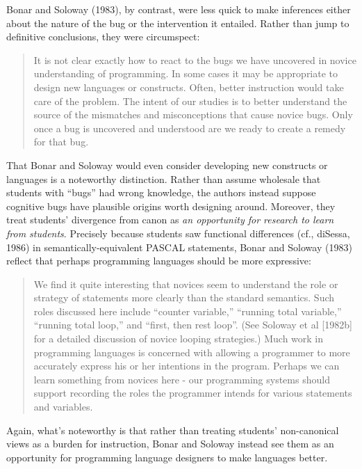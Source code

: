 Bonar and Soloway (1983), by contrast, were less quick to make
inferences either about the nature of the bug or the intervention
it entailed. Rather than jump to definitive conclusions, they were
circumspect:

\begin{quote}
  It is not clear exactly how to react to the bugs we have uncovered in
  novice understanding of programming. In some cases it may be appropriate
  to design new languages or constructs. Often, better instruction would
  take care of the problem. The intent of our studies is to better
  understand the source of the mismatches and misconceptions that cause
  novice bugs. Only once a bug is uncovered and understood are we ready to
  create a remedy for that bug. \cite{bonar_uncovering_1983}
\end{quote}

That Bonar and Soloway would even consider developing new constructs or
languages is a noteworthy distinction. Rather than assume wholesale that
students with ``bugs'' had wrong knowledge, the authors instead suppose
cognitive bugs have plausible origins worth designing around. Moreover,
they treat students' divergence from canon as \emph{an opportunity for
research to learn from students}. Precisely because students saw
functional differences (cf., diSessa, 1986) in semantically-equivalent
PASCAL statements, Bonar and Soloway (1983) reflect that perhaps
programming languages should be more expressive:

\begin{quote}
  We find it quite interesting that novices seem to understand the role or
  strategy of statements more clearly than the standard semantics. Such
  roles discussed here include ``counter variable,'' ``running total
  variable,'' ``running total loop,'' and ``first, then rest loop''. (See
  Soloway et al {[}1982b{]} for a detailed discussion of novice looping
  strategies.) Much work in programming languages is concerned with
  allowing a programmer to more accurately express his or her intentions
  in the program. Perhaps we can learn something from novices here - our
  programming systems should support recording the roles the programmer
  intends for various statements and variables. \cite{bonar_uncovering_1983}
\end{quote}

Again, what's noteworthy is that rather than treating students'
non-canonical views as a burden for instruction, Bonar and Soloway
instead see them as an opportunity for programming language designers to
make languages better.

